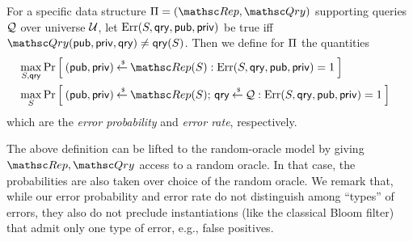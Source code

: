 
 

\begin{definition} \rm
For a specific data structure $\setprim=(\Rep, \Qry)$ supporting
queries ${\cal Q}$ over universe ${\cal U}$, let
$\mathrm{Err}(S,\mathsf{qry},{\sf pub},{\sf priv})$ be  true iff
$\Qry(\pubaux,\privaux, \qry) \neq \qry(S)$.  Then we define for
$\Pi$ the quantities
\begin{align*}
&\max_{S,\qry}\Prob{(\pubaux,\privaux) \getsr \Rep(S) :
\mathrm{Err}(S,\qry,\pubaux,\privaux)=1 } &\\
&\max_{S}\Prob{(\pubaux,\privaux) \getsr \Rep(S);\, \qry \getsr \calQ :
\mathrm{Err}(S,\qry,\pubaux,\privaux)=1} &
\end{align*}
which are the \emph{error probability} and \emph{error rate}, respectively.
%
\hfill\dqed
\end{definition}


The above definition can be lifted to the random-oracle model by
giving $\Rep, \Qry$ access to a random oracle. In that case, the
probabilities are also taken over choice of the random oracle. We
remark that, while our error probability and error rate do not
distinguish among ``types'' of errors, they also do not preclude
instantiations (like the classical Bloom filter) that admit only one
type of error, e.g., false positives.


